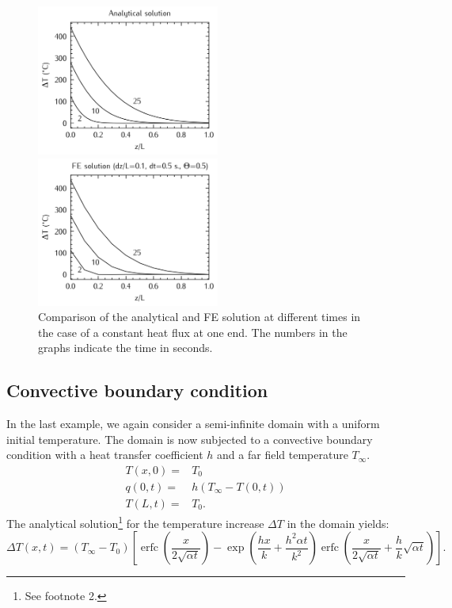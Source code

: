 \documentclass[10pt, a4paper, twoside, headinclude,footinclude, BCOR5mm]{scrartcl}
\DeclareMathOperator{\erfc}{erfc}
\begin{document}
\begin{figure}
\centering
\begin{minipage}{.5\textwidth}
  \centering
  \includegraphics[width=60mm]{fig/heatflux_analytical_sol.png}
\end{minipage}%
\begin{minipage}{.5\textwidth}
  \centering
  \includegraphics[width=60mm]{fig/heatflux_FE_t0.5_dt0.1s.png}
\end{minipage}
\caption{Comparison of the analytical and FE solution at different times in the case of a constant heat flux at one end. The numbers in the graphs indicate the time in seconds.}
\label{fig:flux_compare}
\end{figure}

\subsection{Convective boundary condition}
\label{sec:org9205675}

In the last example, we again consider a semi-infinite domain with a uniform initial temperature. The domain is now subjected to a convective boundary condition with a heat transfer coefficient \(h\) and a far field temperature \(T_{\infty}\).
\begin{eqnarray*}
  T(x, 0) =& T_0\\
  q(0, t) =& h(T_{\infty} - T(0,t))\\
  T(L, t) =& T_0.
\end{eqnarray*}
The analytical solution\footnote{See footnote 2.} for the temperature increase \(\Delta T\) in the domain yields:
\begin{equation*}
\Delta T(x,t) = (T_{\infty} - T_0)
                \left[\erfc\left( \frac{x}{2\sqrt{\alpha t}} \right) -
                \exp\left( \frac{hx}{k}+\frac{h^2 \alpha t}{k^2} \right)
                \erfc\left( \frac{x}{2\sqrt{\alpha t}} + \frac{h}{k}\sqrt{\alpha t} \right) \right].
\end{equation*}
\end{document}
